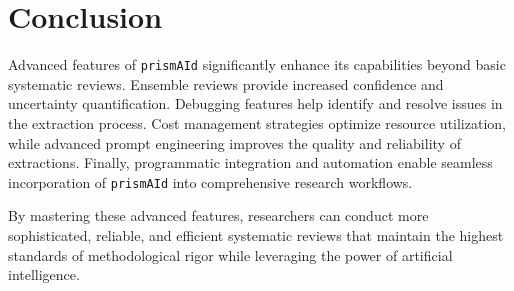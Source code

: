 \section{Conclusion}

Advanced features of \texttt{prismAId} significantly enhance its capabilities beyond basic systematic reviews. Ensemble reviews provide increased confidence and uncertainty quantification. Debugging features help identify and resolve issues in the extraction process. Cost management strategies optimize resource utilization, while advanced prompt engineering improves the quality and reliability of extractions. Finally, programmatic integration and automation enable seamless incorporation of \texttt{prismAId} into comprehensive research workflows.

By mastering these advanced features, researchers can conduct more sophisticated, reliable, and efficient systematic reviews that maintain the highest standards of methodological rigor while leveraging the power of artificial intelligence.

